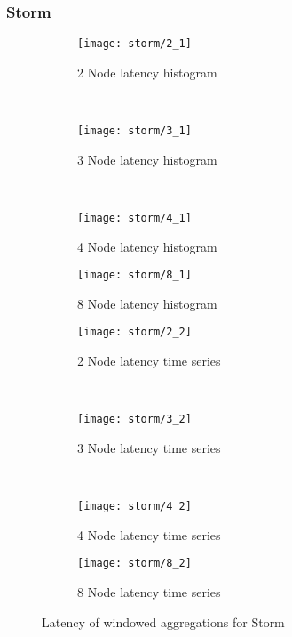 \subsubsection{Storm}


\begin{figure*}
    \centering
    \begin{subfigure}[b]{0.49\textwidth}
        \texttt{[image: storm/2\_1]}
        \caption{2 Node latency histogram}
    \end{subfigure}
    ~ %
    \begin{subfigure}[b]{0.49\textwidth}
        \texttt{[image: storm/3\_1]}
        \caption{3 Node latency histogram}
    \end{subfigure}
    ~ %
    \begin{subfigure}[b]{0.49\textwidth}
        \texttt{[image: storm/4\_1]}
        \caption{4 Node latency histogram}
    \end{subfigure}
        \begin{subfigure}[b]{0.49\textwidth}
        \texttt{[image: storm/8\_1]}
        \caption{8 Node latency histogram}
    \end{subfigure}


    \begin{subfigure}[b]{0.49\textwidth}
        \texttt{[image: storm/2\_2]}
        \caption{2 Node latency time series}
    \end{subfigure}
    ~ %
    \begin{subfigure}[b]{0.49\textwidth}
        \texttt{[image: storm/3\_2]}
        \caption{3 Node latency time series}
    \end{subfigure}
    ~ %
    \begin{subfigure}[b]{0.49\textwidth}
        \texttt{[image: storm/4\_2]}
        \caption{4 Node latency time series}
    \end{subfigure}
        \begin{subfigure}[b]{0.49\textwidth}
        \texttt{[image: storm/8\_2]}
        \caption{8 Node latency time series}
    \end{subfigure}

    \label{fig_flink_agg_1}
        \caption{Latency of windowed aggregations for Storm}
\end{figure*}



